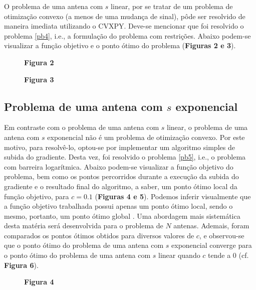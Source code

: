 \documentclass[a4paper,12pt]{article}
\begin{document}
O problema de uma antena com $s$ linear, por se tratar de um problema de otimização convexo (a menos de uma mudança de sinal), pôde ser resolvido de maneira imediata utilizando o CVXPY. Deve-se mencionar que foi resolvido o problema \eqref{pb4}, i.e., a formulação do problema com restrições. Abaixo podem-se visualizar a função objetivo e o ponto ótimo do problema (\textbf{Figuras 2 e 3}).
\begin{figure}[h]
	\begin{center}
		
	\end{center}
	\vspace{-0.4in}
	\caption*{\textbf{Figura 2}}
\end{figure}

\begin{figure}[h]	
	\begin{center}
		
	\end{center}
	\vspace{-0.4in}
	\caption*{\textbf{Figura 3}}
\end{figure}

\subsection{Problema de uma antena com $s$ exponencial}

Em contraste com o problema de uma antena com $s$ linear, o problema de uma antena com $s$ exponencial não é um problema de otimização convexo. Por este motivo, para resolvê-lo, optou-se por implementar um algoritmo simples de subida do gradiente. Desta vez, foi resolvido o problema \eqref{pb5}, i.e., o problema com barreira logarítmica. Abaixo podem-se visualizar a função objetivo do problema, bem como os pontos percorridos durante a execução da subida do gradiente e o resultado final do algoritmo, a saber, um ponto ótimo local da função objetivo, para $c = 0.1$ (\textbf{Figuras 4 e 5}). Podemos inferir visualmente que a função objetivo trabalhada possui apenas um ponto ótimo local, sendo o mesmo, portanto, um ponto ótimo global . Uma abordagem mais sistemática desta matéria será desenvolvida para o problema de $N$ antenas. Ademais, foram comparados os pontos ótimos obtidos para diversos valores de $c$, e observou-se que o ponto ótimo do problema de uma antena com $s$ exponencial converge para o ponto ótimo do problema de uma antena com $s$ linear quando $c$ tende a $0$ (cf. \textbf{Figura 6}).

\begin{figure}[h]
	\begin{center}
		
	\end{center}
	\vspace{-0.4in}
	\caption*{\textbf{Figura 4}}
\end{figure}
\end{document}
